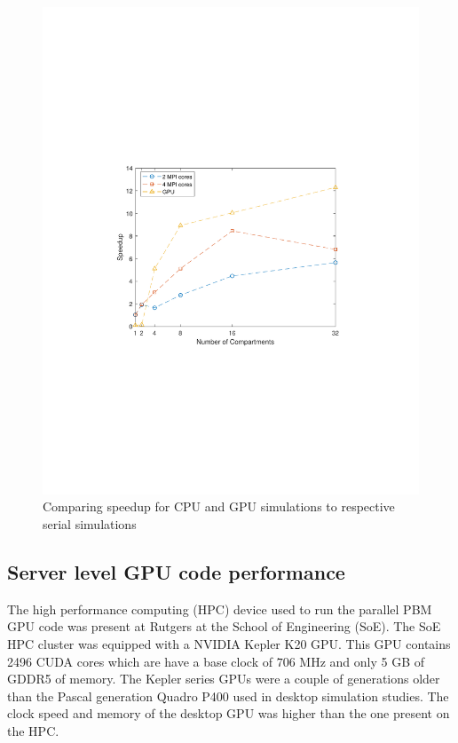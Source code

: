 \documentclass[preprint,10pt,authoryear,review]{elsarticle}
\begin{document}
\begin{linenumbers}
\begin{figure}[h]
\centering
\includegraphics[scale=0.7,trim=120 240 120 240, clip]{speedup_desktop.pdf}
\caption{Comparing speedup for CPU and GPU simulations to respective serial simulations}
\label{fig:res_desktop_speedup}
\end{figure}



\subsection{Server level GPU code performance}
The high performance computing (HPC) device used to run the parallel PBM GPU code 
was present at Rutgers at the School of Engineering (SoE). The SoE HPC cluster was 
equipped with a NVIDIA Kepler K20 GPU. This GPU contains 2496 CUDA cores which are 
have a base clock of $706$ MHz and only 5 GB of GDDR5 of memory. The Kepler series 
GPUs were a couple of generations older than the Pascal generation Quadro P400 used 
in desktop simulation studies. The clock speed and memory of the desktop GPU was 
higher than the one present on the HPC. 


\end{linenumbers}
\end{document}
